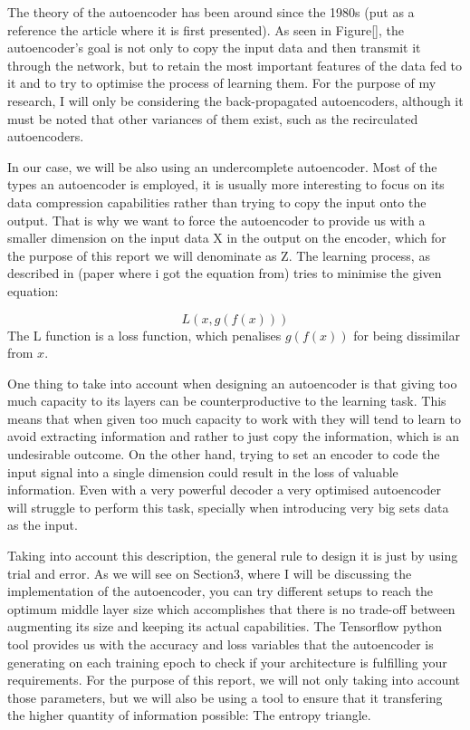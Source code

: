 \documentclass[12pt]{report}
\begin{document}
The theory of the autoencoder has been around since the 1980s (put as a reference the article where it is first presented). As seen in Figure[], the autoencoder's goal is not only to copy the input data and then transmit it through the network, but to retain the most important features of the data fed to it and to try to optimise the process of learning them. For the purpose of my research, I will only be considering the back-propagated autoencoders, although it must be noted that other variances of them exist, such as the recirculated autoencoders. \par

In our case, we will be also using an undercomplete autoencoder. Most of the types an autoencoder is employed, it is usually more interesting to focus on its data compression capabilities rather than trying to copy the input onto the output. That is why we want to force the autoencoder to provide us with a smaller dimension on the input data X in the output on the encoder, which for the purpose of this report we will denominate as Z. The learning process, as described in (paper where i got the equation from) tries to minimise the given equation: \par

\begin{equation}\label{eq:artificial neuron}
L(x,g(f(x)))
\end{equation}
The L function is a loss function, which penalises $g(f(x))$ for being dissimilar from $x$.

One thing to take into account when designing an autoencoder is that giving too much capacity to its layers can be counterproductive to the learning task. This means that when given too much capacity to work with they will tend to learn to avoid extracting information and rather to just copy the information, which is an undesirable outcome. On the other hand, trying to set an encoder to code the input signal into a single dimension could result in the loss of valuable information. Even with a very powerful decoder a very optimised autoencoder will struggle to perform this task, specially when introducing very big sets data as the input. \par

Taking into account this description, the general rule to design it is just by using trial and error. As we will see on Section3, where I will be discussing the implementation of the autoencoder, you can try different setups to reach the optimum middle layer size which accomplishes that there is no trade-off between augmenting its size and keeping its actual capabilities. The Tensorflow python tool provides us with the accuracy and loss variables that the autoencoder is generating on each training epoch to check if your architecture is fulfilling your requirements. For the purpose of this report, we will not only taking into account those parameters, but we will also be using a tool to ensure that it transfering the higher quantity of information possible: The entropy triangle.
\end{document}
